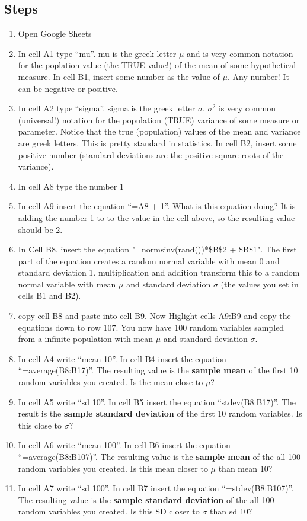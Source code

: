 \documentclass[]{book}
\providecommand{\tightlist}{%
  \setlength{\itemsep}{0pt}\setlength{\parskip}{0pt}}
\begin{document}
\hypertarget{steps}{%
\subsection{Steps}\label{steps}}

\begin{enumerate}
\def\labelenumi{\arabic{enumi}.}
\tightlist
\item
  Open Google Sheets
\item
  In cell A1 type ``mu''. mu is the greek letter \(\mu\) and is very common notation for the poplation value (the TRUE value!) of the mean of some hypothetical measure. In cell B1, insert some number as the value of \(\mu\). Any number! It can be negative or positive.
\item
  In cell A2 type ``sigma''. sigma is the greek letter \(\sigma\). \(\sigma^2\) is very common (universal!) notation for the population (TRUE) variance of some measure or parameter. Notice that the true (population) values of the mean and variance are greek letters. This is pretty standard in statistics. In cell B2, insert some positive number (standard deviations are the positive square roots of the variance).
\item
  In cell A8 type the number 1
\item
  In cell A9 insert the equation ``=A8 + 1''. What is this equation doing? It is adding the number 1 to to the value in the cell above, so the resulting value should be 2.
\item
  In Cell B8, insert the equation "=normsinv(rand())*\$B\$2 + \$B\$1". The first part of the equation creates a random normal variable with mean 0 and standard deviation 1. multiplication and addition transform this to a random normal variable with mean \(\mu\) and standard deviation \(\sigma\) (the values you set in cells B1 and B2).
\item
  copy cell B8 and paste into cell B9. Now Higlight cells A9:B9 and copy the equations down to row 107. You now have 100 random variables sampled from a infinite population with mean \(\mu\) and standard deviation \(\sigma\).
\item
  In cell A4 write ``mean 10''. In cell B4 insert the equation ``=average(B8:B17)''. The resulting value is the \textbf{sample mean} of the first 10 random variables you created. Is the mean close to \(\mu\)?
\item
  In cell A5 write ``sd 10''. In cell B5 insert the equation ``stdev(B8:B17)''. The result is the \textbf{sample standard deviation} of the first 10 random variables. Is this close to \(\sigma\)?
\item
  In cell A6 write ``mean 100''. In cell B6 insert the equation ``=average(B8:B107)''. The resulting value is the \textbf{sample mean} of the all 100 random variables you created. Is this mean closer to \(\mu\) than mean 10?
\item
  In cell A7 write ``sd 100''. In cell B7 insert the equation ``=stdev(B8:B107)''. The resulting value is the \textbf{sample standard deviation} of the all 100 random variables you created. Is this SD closer to \(\sigma\) than sd 10?
\end{enumerate}
\end{document}
